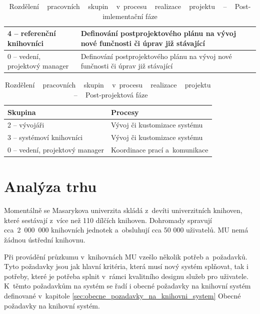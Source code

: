 \documentclass[
	11pt, oneside, printed, final, palatino
	microtype,
	table,   %
	lof,     %
	lot     %
]{fithesis3}
\newcommand{\bold}[1]{\textbf{#1}}
\begin{document}
{\begin{table}
\begin{tabular}{| p{3cm} | p{8.3cm} |}
	4 – referenční knihovníci
    & 
    Definování postprojektového plánu na vývoj nové funčnosti či úprav již stávající
    \\ \hline
    
	0 – vedení, projektový manager
    & 
    Definování postprojektového plánu na vývoj nové funčnosti či úprav již stávající
    \\ \hline
    
    \end{tabular}
    \caption{Rozdělení ~ pracovních ~  skupin ~  v~procesu ~  realizace ~  projektu ~ – ~ Post-imlementační fáze}
\end{table}

\begin{table}
    \centering
    \begin{tabular}{| p{3cm} | p{8.3cm} |}
    \hline
    \bold{Skupina} 	
    & 
    \bold{Procesy} 
    \\ \hline
    
	2 – vývojáři
    & 
	Vývoj či kustomizace systému
    \\ \hline
    
	3 – systémoví knihovníci
    & 
    Vývoj či kustomizace systému
    \\ \hline
    
	0 – vedení, projektový manager
    & 
    Koordinace prací a~komunikace
    \\ \hline
    
    \end{tabular}
    \caption{Rozdělení ~ pracovních ~  skupin ~  v~procesu ~  realizace ~  projektu ~ – ~ Post-projektová fáze}
\end{table}

\section{Analýza trhu}
Momentálně se Masarykova univerzita skládá z~devíti univerzitních knihoven, které sestávají z~více než 110 dílčích knihoven. Dohromady spravují cca~2~000~000 knihovních jednotek a~obsluhují cca 50 000 uživatelů. MU nemá žádnou ústřední knihovnu.

Při provádění průzkumu v~knihovnách MU vzešlo několik potřeb a~požadavků. Tyto požadavky jsou jak hlavní kritéria, která musí nový systém splňovat, tak i potřeby, které je potřeba splnit v~rámci kvalitního designu služeb pro uživatele. K~těmto požadavkům na systém se řadí i obecné požadavky na knihovní systém definované v~kapitole \ref{sec:obecne_pozadavky_na_knihovni_system} Obecné požadavky na knihovní systém.

}
\end{document}
